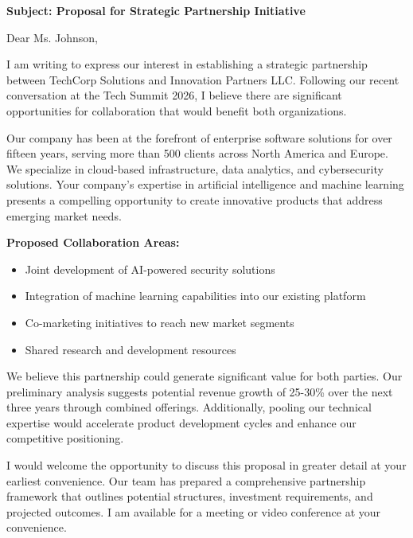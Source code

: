 \documentclass[11pt]{article}
\begin{document}
\noindent
\textbf{Subject: Proposal for Strategic Partnership Initiative}

\vspace{1em}

\noindent
Dear Ms. Johnson,

\vspace{1em}


I am writing to express our interest in establishing a strategic partnership between TechCorp Solutions and Innovation Partners LLC. Following our recent conversation at the Tech Summit 2026, I believe there are significant opportunities for collaboration that would benefit both organizations.

Our company has been at the forefront of enterprise software solutions for over fifteen years, serving more than 500 clients across North America and Europe. We specialize in cloud-based infrastructure, data analytics, and cybersecurity solutions. Your company's expertise in artificial intelligence and machine learning presents a compelling opportunity to create innovative products that address emerging market needs.

\textbf{Proposed Collaboration Areas:}

\begin{itemize}
    \item Joint development of AI-powered security solutions
    \item Integration of machine learning capabilities into our existing platform
    \item Co-marketing initiatives to reach new market segments
    \item Shared research and development resources
\end{itemize}

We believe this partnership could generate significant value for both parties. Our preliminary analysis suggests potential revenue growth of 25-30\% over the next three years through combined offerings. Additionally, pooling our technical expertise would accelerate product development cycles and enhance our competitive positioning.

I would welcome the opportunity to discuss this proposal in greater detail at your earliest convenience. Our team has prepared a comprehensive partnership framework that outlines potential structures, investment requirements, and projected outcomes. I am available for a meeting or video conference at your convenience.
\end{document}
